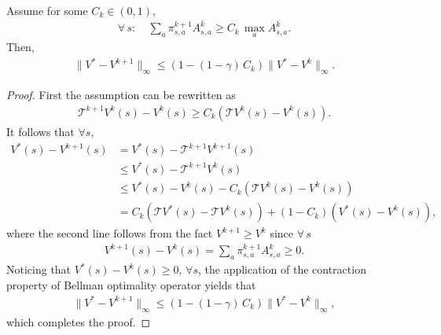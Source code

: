 \begin{theorem}\label{thm:linear-infinity}
    Assume for some $C_k\in(0,1)$,
\begin{align*}\forall\,s:\quad\sum_a\pi^{k+1}_{s,a}A^k_{s,a}\geq C_k\,\max_aA^k_{s,a}.
\end{align*}
Then, 
\begin{align*}
\|V^*-V^{k+1}\|_\infty\leq \left(1-(1-\gamma)\,C_k\right)\|V^*-V^{k}\|_\infty.
\end{align*}
\end{theorem}
\begin{proof}
    First the assumption can be rewritten as 
\begin{align*}
\mathcal{T}^{k+1}V^k(s)-V^k(s)\geq C_k\left(\mathcal{T}V^k(s)-V^k(s)\right).
\end{align*}
It follows that $\forall s$,
\begin{align*}
 V^*(s)-V^{k+1}(s)&=V^*(s)-\mathcal{T}^{k+1}V^{k+1}(s)\\
&\leq V^*(s)-\mathcal{T}^{k+1}V^{k}(s)\\
&\leq V^*(s)-V^{k}(s)-C_k\left(\mathcal{T}V^{k}(s)-V^{k}(s)\right)\\
&=C_k\left(\mathcal{T}V^*(s)-\mathcal{T}V^{k}(s)\right)+(1-C_k)\left(V^*(s)-V^{k}(s)\right),
\end{align*}
where the second line follows from the fact $V^{k+1}\geq V^k$ since $\forall\,s$ 
\begin{align*}
    V^{k+1}(s)-V^k(s)=\sum_a\pi^{k+1}_{s,a}A^k_{s,a}\ge 0.
\end{align*}
Noticing that $V^*(s)-V^k(s)\geq 0,\,\forall s$, the application of the contraction property of Bellman optimality operator yields that
\begin{align*}
\|V^*-V^{k+1}\|_\infty\leq \left(1-(1-\gamma)\,C_k\right)\|V^*-V^{k}\|_\infty,
\end{align*}
which completes the proof.
\end{proof}

